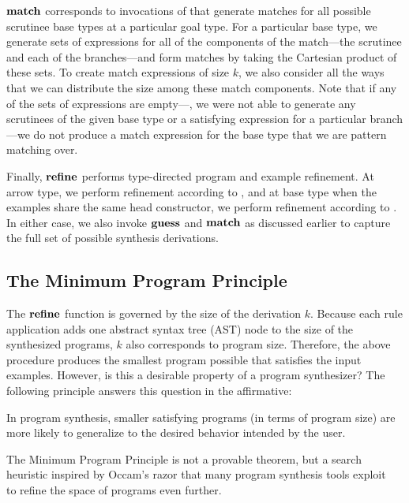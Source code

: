$\mathbf{match}$ corresponds to invocations of  that generate matches for all possible scrutinee base types at a particular goal type.
For a particular base type, we generate sets of expressions for all of the components of the match---the scrutinee and each of the branches---and form matches by taking the Cartesian product of these sets.
To create match expressions of size $k$, we also consider all the ways that we can distribute the size among these match components.
Note that if any of the sets of expressions are empty---\ie, we were not able to generate any scrutinees of the given base type or a satisfying expression for a particular branch---we do not produce a match expression for the base type that we are pattern matching over.

Finally, $\mathbf{refine}$ performs type-directed program and example refinement.
At arrow type, we perform refinement according to , and at base type when the examples share the same head constructor, we perform refinement according to .
In either case, we also invoke $\mathbf{guess}$ and $\mathbf{match}$ as discussed earlier to capture the full set of possible synthesis derivations.

\subsection{The Minimum Program Principle}
\label{subsec:the-minimum-program-principle}

The $\mathbf{refine}$ function is governed by the size of the derivation $k$.
Because each rule application adds one abstract syntax tree (AST) node to the size of the synthesized programs, $k$ also corresponds to program size.
Therefore, the above procedure produces the smallest program possible that satisfies the input examples.
However, is this a desirable property of a program synthesizer?
The following principle answers this question in the affirmative:
\begin{definition}
  In program synthesis, smaller satisfying programs (in terms of program size) are more likely to generalize to the desired behavior intended by the user.
\end{definition}
The Minimum Program Principle is not a provable theorem, but a search heuristic inspired by Occam's razor that many program synthesis tools exploit~\citep{summers-popl-1976, albarghouthi-cav-2013, perelman-pldi-2014, feser-pldi-2015} to refine the space of programs even further.

